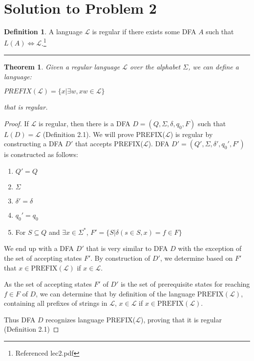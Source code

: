 \documentclass[11pt]{report}
\newcounter{problem}
\theoremstyle{definition}
\newtheorem{definition}{Definition}[problem]
\theoremstyle{plain}
\theoremstyle{plain}
\newtheorem{theorem*}{Theorem}
\begin{document}
\pagebreak

\section*{Solution to Problem 2}

\begin{definition}
A language $\mathcal{L}$ is regular if there exists some DFA $A$ such that $L(A) \Longleftrightarrow \mathcal{L}$.\footnote{Referenced lec2.pdf}
\end{definition}

\hrule

\begin{theorem*}
Given a regular language $\mathcal{L}$ over the alphabet $\Sigma$, we can define a language:
\begin{center}
$PREFIX(\mathcal{L})=\{ x | \exists w,xw \in \mathcal{L} \}$
\end{center}
that is regular.
\end{theorem*}

\begin{proof}
If $\mathcal{L}$ is regular, then there is a DFA $D=(Q,\Sigma,\delta,q_{0},F)$ such that $L(D)=\mathcal{L}$ (Definition 2.1).
We will prove PREFIX($\mathcal{L}$) is regular by constructing a DFA $D'$ that accepts PREFIX($\mathcal{L}$). 
DFA $D'=(Q',\Sigma,\delta',q_{0}',F')$ is constructed as follows:

\begin{enumerate}
\item $Q' = Q$
\item $\Sigma$
\item $\delta' = \delta$
\item $q_{0}' = q_{0}$
\item For $S \subseteq Q$ and $\exists x \in \Sigma^{*}$, $F'=\{S|\delta(s \in S,x) = f \in F \}$
\end{enumerate}

\noindent We end up with a DFA $D'$ that is very similar to DFA $D$ 
with the exception of the set of accepting states $F'$. 
By construction of $D'$, we determine based on $F'$ that $x \in \text{PREFIX}(\mathcal{L})$
if $x \in \mathcal{L}$. \newline
 
\noindent As the set of accepting states $F'$ of $D'$ is the set of prerequisite states for reaching $f \in F$ of $D$, we can determine that by definition of the language $\text{PREFIX}(\mathcal{L})$,
containing all prefixes of strings in $\mathcal{L}$, $x \in \mathcal{L}$
if $x \in \text{PREFIX}(\mathcal{L})$. \newline

\noindent Thus DFA $D$ recognizes language PREFIX($\mathcal{L}$), proving that it is regular (Definition 2.1)
\end{proof}
\end{document}
